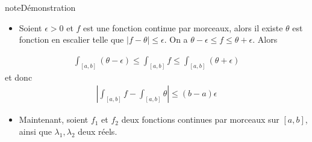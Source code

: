 \documentclass[letterpaper,10pt,french]{jupyterBook}
\begin{document}
\begin{sphinxadmonition}{note}{Démonstration}
\begin{itemize}
\item {} 
\sphinxAtStartPar
Soient \(\epsilon>0\) et \(f\) est une fonction continue par morceaux, alors il existe \(\theta\) est fonction en escalier telle que \(|f-\theta|\leq \epsilon\). On a \(\theta - \epsilon \leq f \leq \theta + \epsilon\). Alors

\end{itemize}
\begin{equation*}
\begin{split}
 \int_{[a, b]} (\theta - \epsilon) \leq  \int_{[a, b]} f \leq  \int_{[a, b]} (\theta + \epsilon)
 \end{split}
\end{equation*}
\sphinxAtStartPar
et donc
\begin{equation*}
\begin{split}
\left|\int_{[a, b]} f- \int_{[a, b]} \theta \right| \leq (b-a)\epsilon
\end{split}
\end{equation*}\begin{itemize}
\item {} 
\sphinxAtStartPar
Maintenant, soient \(f_1\) et \(f_2\) deux fonctions continues par morceaux sur \([a, b]\), ainsi que \(\lambda_1, \lambda_2\) deux réels.

\end{itemize}


\end{sphinxadmonition}
\end{document}
